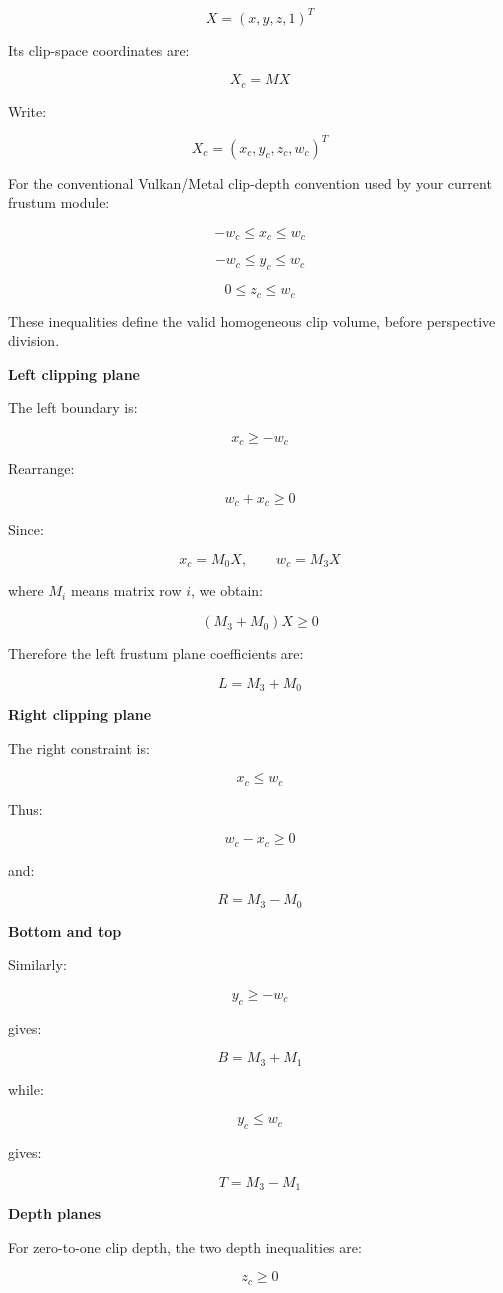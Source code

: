 \[
X=(x,y,z,1)^T
\]

Its clip-space coordinates are:

\[
X_c=MX
\]

Write:

\[
X_c=(x_c,y_c,z_c,w_c)^T
\]

For the conventional Vulkan/Metal clip-depth convention used by your current frustum module:

\[
-w_c\le x_c\le w_c
\]

\[
-w_c\le y_c\le w_c
\]

\[
0\le z_c\le w_c
\]

These inequalities define the valid homogeneous clip volume, before perspective division.

\textbf{Left clipping plane}

The left boundary is:

\[
x_c\ge-w_c
\]

Rearrange:

\[
w_c+x_c\ge0
\]

Since:

\[
x_c=M_0X,\qquad w_c=M_3X
\]

where \(M_i\) means matrix row \(i\), we obtain:

\[
\boxed{ (M_3+M_0)X\ge0 }
\]

Therefore the left frustum plane coefficients are:

\[
\boxed{L=M_3+M_0}
\]

\textbf{Right clipping plane}

The right constraint is:

\[
x_c\le w_c
\]

Thus:

\[
w_c-x_c\ge0
\]

and:

\[
\boxed{R=M_3-M_0}
\]

\textbf{Bottom and top}

Similarly:

\[
y_c\ge-w_c
\]

gives:

\[
\boxed{B=M_3+M_1}
\]

while:

\[
y_c\le w_c
\]

gives:

\[
\boxed{T=M_3-M_1}
\]

\textbf{Depth planes}

For zero-to-one clip depth, the two depth inequalities are:

\[
z_c\ge0
\]


